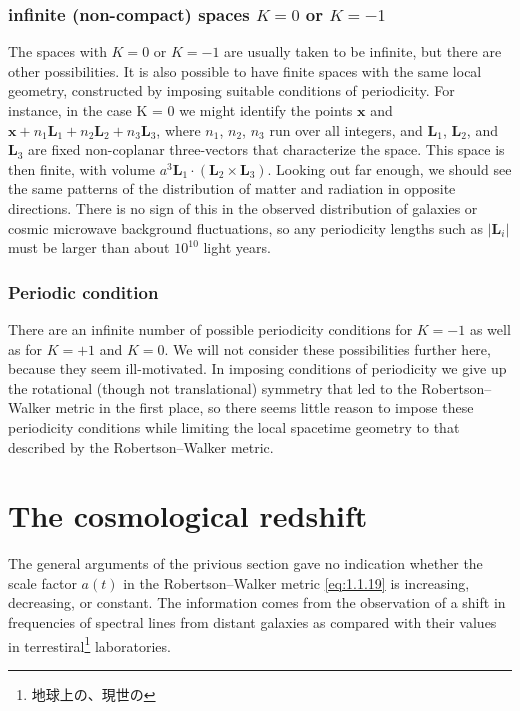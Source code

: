 \documentclass[11pt,a4paper,dvipdfmx]{jsarticle}
\theoremstyle{plain}
\theoremstyle{break}
\newcommand{\mbx}{\mathbf{x}}
\newcommand{\mbL}{\mathbf{L}}
\begin{document}
\subsubsection{infinite (non-compact) spaces $K=0$ or $K=-1$ }
The spaces with $K=0$ or $K=-1$ are usually taken to be infinite, but there are other possibilities.
It is also possible to have finite spaces with the same local geometry, constructed by imposing suitable conditions of periodicity.
For instance, in the case K = 0 we might identify the points $\mbx$ and $\mbx + n_1 \mbL_1 + n_2 \mbL_2 + n_3 \mbL_3$, where $n_1$, $n_2$, $n_3$ run over all integers, and $\mbL_1$, $\mbL_2$, and $\mbL_3$ are fixed non-coplanar three-vectors that characterize the space.
This space is then finite, with volume $a^3 \mbL_1 \cdot (\mbL_2 \times \mbL_3)$.
 Looking out far enough, we should see the same patterns of the distribution of matter and radiation in opposite directions. There is no sign of this in the observed distribution of galaxies or cosmic microwave background fluctuations,
so any periodicity lengths such as $|\mbL_i |$ must be larger than about $10^{10}$ light years.

\subsubsection{Periodic condition}
There are an infinite number of possible periodicity conditions for $K = -1$ as well as for $K = +1$ and $K = 0$.
We will not consider these possibilities further here, because they seem ill-motivated. In imposing conditions of periodicity we give up the rotational (though not translational) symmetry that led to the Robertson–Walker metric in the first place,
so there seems little reason to impose these periodicity conditions while limiting the local spacetime geometry to that described by the Robertson–Walker metric.

\section{The cosmological redshift}\label{sec:1.2.The-cosmological-redshift}
The general arguments of the privious section gave no indication whether the scale factor $a(t)$ in the Robertson–Walker metric \eqref{eq:1.1.19} is increasing, decreasing, or constant.
The information comes from the observation of a shift in frequencies of spectral lines from distant galaxies as compared with their values in terrestiral\footnote{地球上の、現世の} laboratories.
\end{document}
